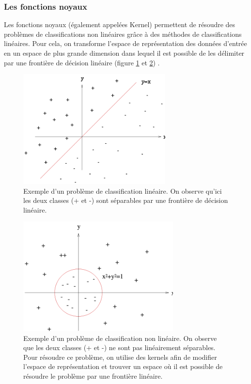 \subsubsection{Les fonctions noyaux}
\label{Le Machine Learning: Les différents algorithmes: SVM: les fonctions noyaux}
Les fonctions noyaux (également appelées Kernel) permettent de résoudre des problèmes de classifications non linéaires grâce à des méthodes de classifications linéaires. Pour cela, on transforme l'espace de représentation des données d'entrée en un espace de plus grande dimension dans lequel il est possible de les délimiter par une frontière de décision linéaire (figure \ref{fig:Svm: Exemple d'un problème de classification linéaire} et \ref{fig:Svm: Exemple d'un problème de classification non linéaire}) .

\begin{figure}[h]
	\centering\includegraphics[height=6cm]{images/svm_regression.png}
	\caption[Exemple d'un problème de classification linéaire]{Exemple d'un problème de classification linéaire. On observe qu'ici les deux classes (+ et -) sont séparables par une frontière de décision linéaire. }
	\label{fig:Svm: Exemple d'un problème de classification linéaire}
\end{figure}

\begin{figure}[h]
	\centering\includegraphics[height=6cm]{images/svm_cercle.png}
	\caption[Exemple d'un problème de classification non linéaire]{Exemple d'un problème de classification non linéaire. On observe que les deux classes (+ et -) ne sont pas linéairement séparables. Pour résoudre ce problème, on utilise des kernels afin de modifier l'espace de représentation et trouver un espace où il est possible de résoudre le problème par une frontière linéaire.}
	\label{fig:Svm: Exemple d'un problème de classification non linéaire}
\end{figure}

